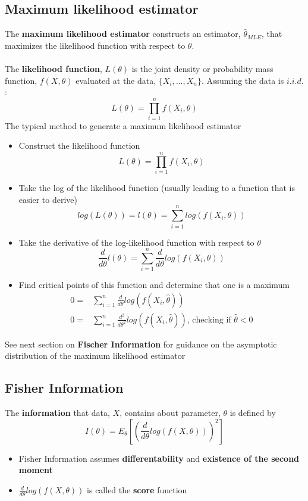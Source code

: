 \documentclass{article}
\begin{document}
\subsection{Maximum likelihood estimator}
The \textbf{maximum likelihood estimator} constructs an estimator, $\hat{\theta}_{MLE}$, that maximizes the likelihood function with respect to $\theta$. \\ \\
The \textbf{likelihood function}, $L(\theta)$ is the joint density or probability mass function, $f(X, \theta)$ evaluated at the data, $\{X_i, \dots, X_n\}$. Assuming the data is $i.i.d.$:
\begin{equation*}
    L(\theta) = \prod_{i=1}^nf(X_i, \theta)
\end{equation*}
The typical method to generate a maximum likelihood estimator
\begin{itemize}
    \item Construct the likelihood function
    \begin{equation*}
        L(\theta) = \prod_{i=1}^nf(X_i, \theta)
    \end{equation*}
    \item Take the log of the likelihood function (usually leading to a function that is easier to derive)
    \begin{equation*}
        log(L(\theta)) = l(\theta) = \sum_{i=1}^nlog(f(X_i, \theta))
    \end{equation*}
    \item Take the derivative of the log-likelihood function with respect to $\theta$
    \begin{equation*}
        \frac{d}{d\theta}l(\theta) = \sum_{i=1}^n\frac{d}{d\theta}log(f(X_i, \theta))
    \end{equation*}
    \item Find critical points of this function and determine that one is a maximum
    \begin{align*}
        0 =& \sum_{i=1}^n\frac{d}{d\theta}log(f(X_i, \hat{\theta}))\\
        0 =& \sum_{i=1}^n\frac{d^2}{d\theta^2}log(f(X_i, \hat{\theta})) \textrm{, checking if } \hat{\theta} < 0
    \end{align*}
\end{itemize}
See next section on \textbf{Fischer Information} for guidance on the asymptotic distribution of the maximum likelihood estimator

\subsection{Fisher Information}
The \textbf{information} that data, $X$, contains about parameter, $\theta$ is defined by
\begin{equation*}
    I(\theta) = E_\theta \left [ \left (\frac{d}{d\theta}log(f(X, \theta)) \right )^2 \right ]
\end{equation*}
\begin{itemize}
    \item Fisher Information assumes \textbf{differentability} and \textbf{existence of the second moment}
    \item $\frac{d}{d\theta}log(f(X, \theta))$ is called the \textbf{score} function
\end{itemize}
\end{document}

